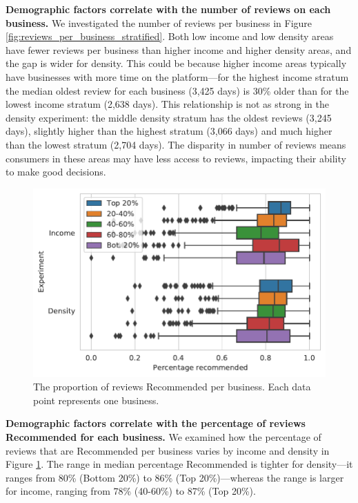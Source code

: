 \textbf{Demographic factors correlate with the number of reviews on each business.} We investigated the number of reviews per business in Figure \ref{fig:reviews_per_business_stratified}. Both low income and low density areas have fewer reviews per business than higher income and higher density areas, and the gap is wider for density. This could be because higher income areas typically have businesses with more time on the platform---for the highest income stratum the median oldest review for each business (3,425 days) is 30\% older than for the lowest income stratum (2,638 days). This relationship is not as strong in the density experiment: the middle density stratum has the oldest reviews (3,245 days), slightly higher than the highest stratum (3,066 days) and much higher than the lowest stratum (2,704 days). The disparity in number of reviews means consumers in these areas may have less access to reviews, impacting their ability to make good decisions.

 \begin{figure}[t]
     \centering
     \includegraphics[width=0.9\columnwidth]{figures/percentage_recommended_per_businesses_extended.pdf}
     \caption{The proportion of reviews Recommended per business. Each data point represents one business.}
     \label{fig:percentage_recommended_per_businesses_extended}
 \end{figure}
 
\textbf{Demographic factors correlate with the percentage of reviews Recommended for each business.} We examined how the percentage of reviews that are Recommended per business varies by income and density in Figure \ref{fig:percentage_recommended_per_businesses_extended}. The range in median percentage Recommended is tighter for density---it ranges from 80\% (Bottom 20\%) to 86\% (Top 20\%)---whereas the range is larger for income, ranging from 78\% (40-60\%) to 87\% (Top 20\%). 

